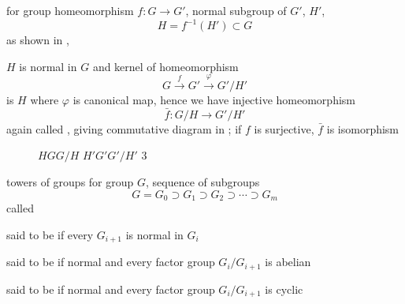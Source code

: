 \documentclass[17pt,landscape]{foils}
\begin{document}
{\item
	for group homeomorphism $f:G\to G'$, normal subgroup of $G'$, $H'$,
		$$H=f^{-1}(H')\subset G$$
		as shown in ,%
		\begin{figure}
		\begin{center}
			\commutativediagram{5em}
				\label{fig:commutative diagram 1}
		\end{center}
		\end{figure}
		$H$ is normal in $G$
		and kernel of homeomorphism
		$$
			G \overset{f}{\to} G'\overset{\varphi}{\to} G'/H'
		$$
		is $H$ where $\varphi$ is canonical map,
		hence we have injective homeomorphism
		$$
			\bar{f}:G/H \to G'/H'
		$$
		again called ,
		giving commutative diagram
		in ;
		if $f$ is surjective, $\bar{f}$ is isomorphism

	\begin{figure}
	\begin{center}
		\largecommutativediagram{6em}%
		{$H$}{$G$}{$G/H$}%
		{$H'$}{$G'$}{$G'/H'$}%
		{3}
			\label{fig:commutative diagram for canonical homeomorphism}
	\end{center}
	\end{figure}
\eit



\begin{mydefinition}{towers of groups}%
	for group $G$,
	sequence of subgroups
	$$
		G = G_0
		\supset G_1
		\supset G_2
		\supset \cdots
		\supset G_m
	$$
	called 
	\bit
	\item
		said to be  if every $G_{i+1}$ is normal in $G_i$
	\item
		said to be  if normal and every factor group $G_i/G_{i+1}$ is abelian
	\item
		said to be  if normal and every factor group $G_i/G_{i+1}$ is cyclic
	\eit
\end{mydefinition}

}
\end{document}
